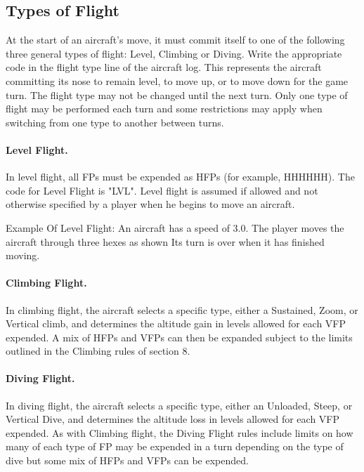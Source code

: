 \subsection{Types of Flight}

At the start of an aircraft's move, it must commit itself to one of the following three general types of flight: Level, Climbing or Diving. Write the appropriate code in the flight type line of the aircraft log. This represents the aircraft committing its nose to remain level, to move up, or to move down for the game turn. The flight type may not be changed until the next turn. Only one type of flight may be performed each turn and some restrictions may apply when switching from one type to another between turns.

\paragraph{Level Flight.} In level flight, all FPs must be expended as HFPs (for example, HHHHHH). The code for Level Flight is "LVL". Level flight is assumed if allowed and not otherwise specified by a player when he begins to move an aircraft.

Example Of Level Flight: An aircraft has a speed of 3.0. The player moves the aircraft through three hexes as shown  Its turn is over when it has finished moving.



\paragraph{Climbing Flight.} In climbing flight, the aircraft selects a specific type, either a Sustained, Zoom, or Vertical climb, and determines the altitude gain in levels allowed for each VFP expended. A mix of HFPs and VFPs can then be expanded subject to the limits outlined in the Climbing rules of section 8.

\paragraph{Diving Flight.} In diving flight, the aircraft selects a specific type, either an Unloaded, Steep, or Vertical Dive, and determines the altitude loss in levels allowed for each VFP expended. As with Climbing flight, the Diving Flight rules include limits on how many of each type of FP may be expended in a turn depending on the type of dive but some mix of HFPs and VFPs can be expended.

